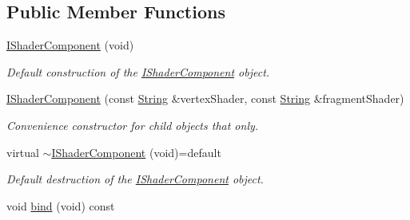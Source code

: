 \subsection*{Public Member Functions}
\begin{DoxyCompactItemize}
\item 
\hyperlink{classsparky_1_1_i_shader_component_a958bfdf2920d0403b739b9c586d0f70d}{I\+Shader\+Component} (void)\hypertarget{classsparky_1_1_i_shader_component_a958bfdf2920d0403b739b9c586d0f70d}{}\label{classsparky_1_1_i_shader_component_a958bfdf2920d0403b739b9c586d0f70d}

\begin{DoxyCompactList}\small\item\em Default construction of the \hyperlink{classsparky_1_1_i_shader_component}{I\+Shader\+Component} object. \end{DoxyCompactList}\item 
\hyperlink{classsparky_1_1_i_shader_component_a46f53c0ea618331b9a1bf4b6b6698324}{I\+Shader\+Component} (const \hyperlink{classsparky_1_1_string}{String} \&vertex\+Shader, const \hyperlink{classsparky_1_1_string}{String} \&fragment\+Shader)\hypertarget{classsparky_1_1_i_shader_component_a46f53c0ea618331b9a1bf4b6b6698324}{}\label{classsparky_1_1_i_shader_component_a46f53c0ea618331b9a1bf4b6b6698324}

\begin{DoxyCompactList}\small\item\em Convenience constructor for child objects that only. \end{DoxyCompactList}\item 
virtual \hyperlink{classsparky_1_1_i_shader_component_a58ac43cdb4ca241cc5e083a83ee44970}{$\sim$\+I\+Shader\+Component} (void)=default\hypertarget{classsparky_1_1_i_shader_component_a58ac43cdb4ca241cc5e083a83ee44970}{}\label{classsparky_1_1_i_shader_component_a58ac43cdb4ca241cc5e083a83ee44970}

\begin{DoxyCompactList}\small\item\em Default destruction of the \hyperlink{classsparky_1_1_i_shader_component}{I\+Shader\+Component} object. \end{DoxyCompactList}\item 
void \hyperlink{classsparky_1_1_i_shader_component_a6ed7ff5dbe96d0fb5bc8f3e53e110e1a}{bind} (void) const \hypertarget{classsparky_1_1_i_shader_component_a6ed7ff5dbe96d0fb5bc8f3e53e110e1a}{}\label{classsparky_1_1_i_shader_component_a6ed7ff5dbe96d0fb5bc8f3e53e110e1a}


\end{DoxyCompactItemize}
